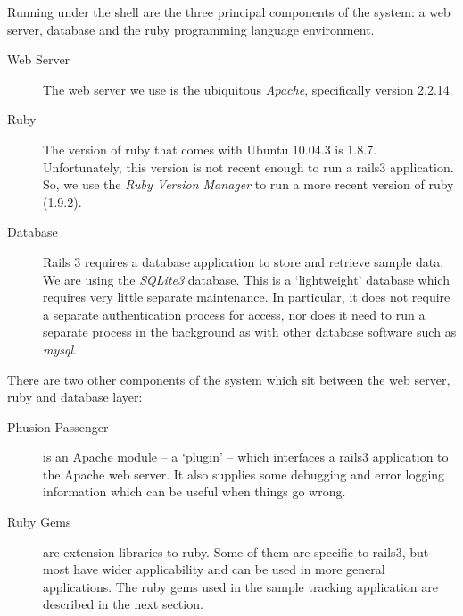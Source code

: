 \documentclass[12pt,twoside]{article}
\begin{document}
Running under the shell are the three principal components of
the system: a web server, database and the ruby programming language
environment.
\begin{description}
\item[Web Server]
The web server we use is the ubiquitous \emph{Apache}, specifically
version 2.2.14.
\item[Ruby]
The version of ruby that comes with Ubuntu 10.04.3 is 1.8.7.
Unfortunately, this version is not recent enough to run a rails3
application. So, we use the \emph{Ruby Version Manager} to run a more
recent version of ruby (1.9.2).
\item[Database]
Rails 3 requires a database application to store and retrieve sample data.
We are using the \emph{SQLite3} database. This is a `lightweight' database
which requires very little separate maintenance. In particular, it
does not require a separate authentication process for access, nor
does it need to run a separate process in the background as with other
database software such as \emph{mysql}.
\end{description}

There are two other components of the system which sit between the
web server, ruby and database layer:

\begin{description}
\item[Phusion Passenger]
is an Apache module -- a `plugin' -- which
interfaces a rails3 application to the Apache web server. It also supplies
some debugging and error logging information which can be useful when
things go wrong.
\item[Ruby Gems]
are extension libraries to ruby. Some of them are
specific to rails3, but most have wider applicability and can be used in
more general applications. The ruby gems used in the sample tracking
application are described in the next section.
\end{description}
\end{document}
